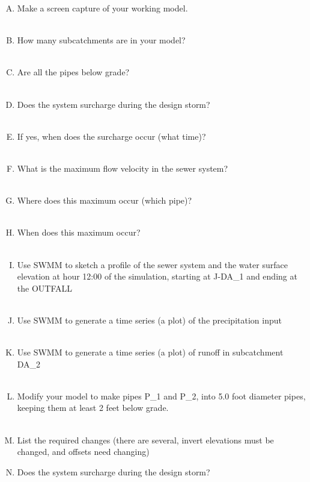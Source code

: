 \documentclass[12pt]{article}
\begin{document}
\begin{enumerate}
\begin{enumerate}[A)]
\item Make a screen capture of your working model. ~\\~\\
\item How many subcatchments are in your model? ~\\~\\
\item Are all the pipes below grade?  ~\\~\\
\item Does the system surcharge during the design storm?  ~\\~\\
\item If yes, when does the surcharge occur (what time)? ~\\~\\
\item What is the maximum flow velocity in the sewer system?  ~\\~\\
\item Where does this maximum occur (which pipe)?  ~\\~\\
\item When does this maximum occur?  ~\\~\\
\item Use SWMM to sketch a profile of the sewer system and the water surface elevation at hour 12:00 of the simulation, starting at J-DA\_1 and ending at the OUTFALL ~\\~\\
\item Use SWMM to generate a time series (a plot) of the precipitation input  ~\\~\\
\item Use SWMM to generate a time series (a plot) of runoff in subcatchment DA\_2  ~\\~\\ 
\item Modify your model to make pipes P\_1 and P\_2, into 5.0 foot diameter pipes, keeping them at least 2 feet below grade.  ~\\~\\
\item List the required changes (there are several, invert elevations must be changed, and offsets need changing)
\item Does the system surcharge during the design storm?  ~\\~\\

\end{enumerate}
\end{enumerate}
\end{document}
